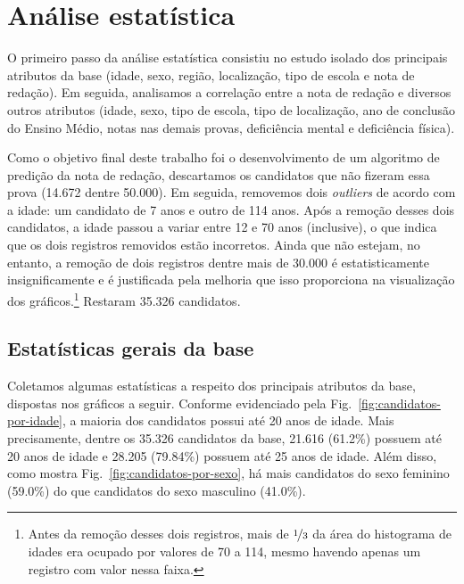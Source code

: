 \documentclass[12pt]{article}
\newcommand{\reffig}[1]{Fig.~\ref{fig:#1}}
\begin{document}
\section{Análise estatística}
\label{sec:analise-estatistica}
O primeiro passo da análise estatística consistiu no estudo isolado dos principais atributos da base (idade, sexo, região, localização, tipo de escola e nota de redação).
Em seguida, analisamos a correlação entre a nota de redação e diversos outros atributos (idade, sexo, tipo de escola, tipo de localização, ano de conclusão do Ensino Médio, notas nas demais provas, deficiência mental e deficiência física).

Como o objetivo final deste trabalho foi o desenvolvimento de um algoritmo de predição da nota de redação, descartamos os candidatos que não fizeram essa prova (14.672 dentre 50.000).
Em seguida, removemos dois \emph{outliers} de acordo com a idade: um candidato de 7 anos e outro de 114 anos.
Após a remoção desses dois candidatos, a idade passou a variar entre 12 e 70 anos (inclusive), o que indica que os dois registros removidos estão incorretos.
Ainda que não estejam, no entanto, a remoção de dois registros dentre mais de 30.000 é estatisticamente insignificamente e é justificada pela melhoria que isso proporciona na visualização dos gráficos.\footnote{Antes da remoção desses dois registros, mais de $\nicefrac{1}{3}$ da área do histograma de idades era ocupado por valores de 70 a 114, mesmo havendo apenas um registro com valor nessa faixa.}
Restaram 35.326 candidatos.

\subsection{Estatísticas gerais da base}
\label{subsec:estatisticas-gerais}
Coletamos algumas estatísticas a respeito dos principais atributos da base, dispostas nos gráficos a seguir.
Conforme evidenciado pela \reffig{candidatos-por-idade}, a maioria dos candidatos possui até 20 anos de idade.
Mais precisamente, dentre os 35.326 candidatos da base, 21.616 (61.2\%) possuem até 20 anos de idade e 28.205 (79.84\%) possuem até 25 anos de idade.
Além disso, como mostra \reffig{candidatos-por-sexo}, há mais candidatos do sexo feminino (59.0\%) do que candidatos do sexo masculino (41.0\%).
\end{document}
